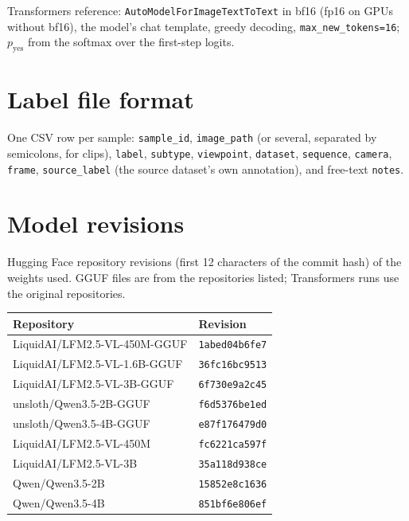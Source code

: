 {\sloppy Transformers reference: \texttt{AutoModelFor\allowbreak ImageTextToText} in bf16 (fp16 on GPUs without bf16), the model's chat template, greedy decoding, \texttt{max\_new\_tokens=16}; $p_\text{yes}$ from the softmax over the first-step logits.\par}

\section{Label file format}
\label{app:labels}
One CSV row per sample: \texttt{sample\_id}, \texttt{image\_path} (or several, separated by semicolons, for clips), \texttt{label}, \texttt{subtype}, \texttt{viewpoint}, \texttt{dataset}, \texttt{sequence}, \texttt{camera}, \texttt{frame}, \texttt{source\_label} (the source dataset's own annotation), and free-text \texttt{notes}.

\section{Model revisions}
\label{app:revisions}
Hugging Face repository revisions (first 12 characters of the commit hash) of the weights used. GGUF files are from the repositories listed; Transformers runs use the original repositories.

\begin{center}\footnotesize
\begin{tabular}{ll}
\toprule
Repository & Revision \\
\midrule
LiquidAI/LFM2.5-VL-450M-GGUF & \texttt{1abed04b6fe7} \\
LiquidAI/LFM2.5-VL-1.6B-GGUF & \texttt{36fc16bc9513} \\
LiquidAI/LFM2.5-VL-3B-GGUF & \texttt{6f730e9a2c45} \\
unsloth/Qwen3.5-2B-GGUF & \texttt{f6d5376be1ed} \\
unsloth/Qwen3.5-4B-GGUF & \texttt{e87f176479d0} \\
LiquidAI/LFM2.5-VL-450M & \texttt{fc6221ca597f} \\
LiquidAI/LFM2.5-VL-3B & \texttt{35a118d938ce} \\
Qwen/Qwen3.5-2B & \texttt{15852e8c1636} \\
Qwen/Qwen3.5-4B & \texttt{851bf6e806ef} \\
\bottomrule
\end{tabular}
\end{center}
